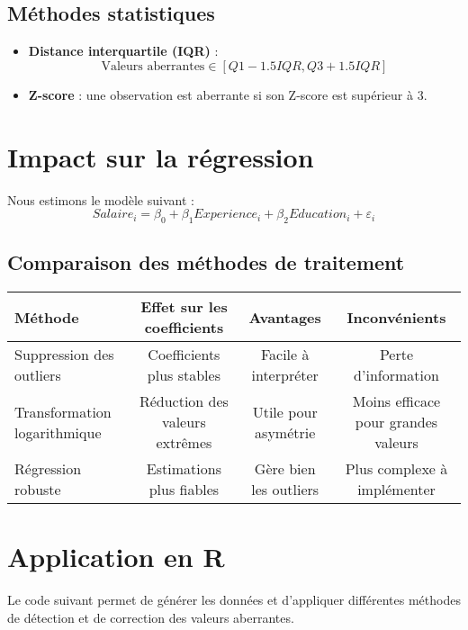 \documentclass[a4paper,12pt]{article}
\begin{document}
\subsection{Méthodes statistiques}
\begin{itemize}
    \item \textbf{Distance interquartile (IQR)} :
    \begin{equation}
        \text{Valeurs aberrantes} \in [Q1 - 1.5 IQR, Q3 + 1.5 IQR]
    \end{equation}
    \item \textbf{Z-score} : une observation est aberrante si son Z-score est supérieur à 3.
\end{itemize}

\section{Impact sur la régression}
Nous estimons le modèle suivant :
\begin{equation}
    Salaire_i = \beta_0 + \beta_1 Experience_i + \beta_2 Education_i + \varepsilon_i
\end{equation}

\subsection{Comparaison des méthodes de traitement}
\begin{center}
    \begin{tabular}{lccc}
    \toprule
    Méthode & Effet sur les coefficients & Avantages & Inconvénients \\
    \midrule
    Suppression des outliers & Coefficients plus stables & Facile à interpréter & Perte d'information \\
    Transformation logarithmique & Réduction des valeurs extrêmes & Utile pour asymétrie & Moins efficace pour grandes valeurs \\
    Régression robuste & Estimations plus fiables & Gère bien les outliers & Plus complexe à implémenter \\
    \bottomrule
    \end{tabular}
\end{center}

\section{Application en R}
Le code suivant permet de générer les données et d'appliquer différentes méthodes de détection et de correction des valeurs aberrantes.
\end{document}
